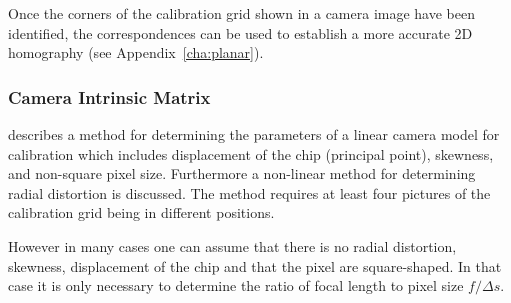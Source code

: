 \documentclass[12pt,a4paper,oneside,openright]{book}
\newcommand{\anx}[1]{Appendix~\ref{cha:#1}}
\begin{document}
\begin{CJK}{UTF8}{}
Once the corners of the calibration grid shown in a camera image have been identified, the correspondences can be used to establish a more accurate \ac{2D} homography (see \anx{planar}).

\subsubsection{Camera Intrinsic Matrix}\label{cha:calib}
\citet{zhang2000flexible} describes a method for determining the parameters of a linear camera model for calibration which includes displacement of the chip (principal point), skewness, and non-square pixel size. Furthermore a non-linear method for determining radial distortion is discussed. The method requires at least four pictures of the calibration grid being in different positions.

However in many cases one can assume that there is no radial distortion, skewness, displacement of the chip and that the pixel are square-shaped. In that case it is only necessary to determine the ratio of focal length to pixel size $f/\Delta s$.


\end{CJK}
\end{document}
